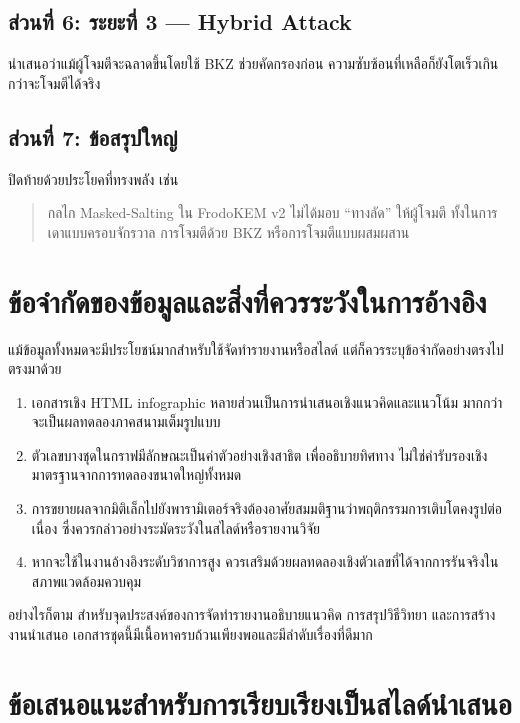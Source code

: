 \documentclass[12pt,a4paper]{article}
\newcommand{\eng}[1]{\textenglish{#1}}
\begin{document}
	\subsection{ส่วนที่ 6: ระยะที่ 3 --- Hybrid Attack}
	
	นำเสนอว่าแม้ผู้โจมตีจะฉลาดขึ้นโดยใช้ \eng{BKZ} ช่วยคัดกรองก่อน ความซับซ้อนที่เหลือก็ยังโตเร็วเกินกว่าจะโจมตีได้จริง
	
	\subsection{ส่วนที่ 7: ข้อสรุปใหญ่}
	
	ปิดท้ายด้วยประโยคที่ทรงพลัง เช่น
	\begin{quote}
		กลไก \eng{Masked-Salting} ใน \eng{FrodoKEM v2} ไม่ได้มอบ ``ทางลัด'' ให้ผู้โจมตี ทั้งในการเดาแบบครอบจักรวาล การโจมตีด้วย \eng{BKZ} หรือการโจมตีแบบผสมผสาน
	\end{quote}
	
	\section{ข้อจำกัดของข้อมูลและสิ่งที่ควรระวังในการอ้างอิง}
	
	แม้ข้อมูลทั้งหมดจะมีประโยชน์มากสำหรับใช้จัดทำรายงานหรือสไลด์ แต่ก็ควรระบุข้อจำกัดอย่างตรงไปตรงมาด้วย
	\begin{enumerate}[label=\arabic*.]
		\item เอกสารเชิง \eng{HTML infographic} หลายส่วนเป็นการนำเสนอเชิงแนวคิดและแนวโน้ม มากกว่าจะเป็นผลทดลองภาคสนามเต็มรูปแบบ
		\item ตัวเลขบางชุดในกราฟมีลักษณะเป็นค่าตัวอย่างเชิงสาธิต เพื่ออธิบายทิศทาง ไม่ใช่ค่ารับรองเชิงมาตรฐานจากการทดลองขนาดใหญ่ทั้งหมด
		\item การขยายผลจากมิติเล็กไปยังพารามิเตอร์จริงต้องอาศัยสมมติฐานว่าพฤติกรรมการเติบโตคงรูปต่อเนื่อง ซึ่งควรกล่าวอย่างระมัดระวังในสไลด์หรือรายงานวิจัย
		\item หากจะใช้ในงานอ้างอิงระดับวิชาการสูง ควรเสริมด้วยผลทดลองเชิงตัวเลขที่ได้จากการรันจริงในสภาพแวดล้อมควบคุม
	\end{enumerate}
	
	อย่างไรก็ตาม สำหรับจุดประสงค์ของการจัดทำรายงานอธิบายแนวคิด การสรุปวิธีวิทยา และการสร้างงานนำเสนอ เอกสารชุดนี้มีเนื้อหาครบถ้วนเพียงพอและมีลำดับเรื่องที่ดีมาก
	
	\section{ข้อเสนอแนะสำหรับการเรียบเรียงเป็นสไลด์นำเสนอ}
	
\end{document}
